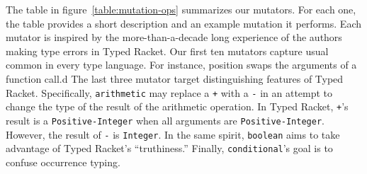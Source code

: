 The table in figure~\ref{table:mutation-ops}  summarizes our mutators. 
For each one, the table provides a short description and an example
mutation it performs. Each mutator is inspired by the more-than-a-decade
long experience of the authors making type errors in Typed Racket. 
Our first ten mutators capture usual common in every type language. 
For instance, position swaps the arguments of a function call.d
The last three mutator target distinguishing features of Typed Racket. 
Specifically, \texttt{arithmetic} may replace a \texttt{+} with a \texttt{-} 
in an attempt to change the type of the result of the arithmetic
operation. In Typed Racket, \texttt{+}'s result is a
\texttt{Positive-Integer} when all arguments are
\texttt{Positive-Integer}. However, the result of \texttt{-} is 
\texttt{Integer}. In the same spirit, \texttt{boolean} aims to take
advantage of Typed Racket's ``truthiness.'' Finally,
\texttt{conditional}'s goal is to confuse occurrence typing.  


